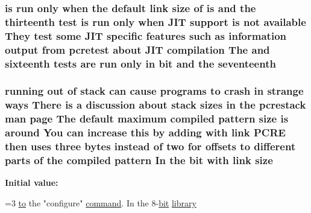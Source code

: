 \subsubsection[{\texorpdfstring{seventeenth}{seventeenth}}]{ {\bf is} {\bf run} only when the {\bf default} link {\bf size} {\bf of} {\bf is} and the thirteenth test {\bf is} {\bf run} only when J\+IT {\bf support} {\bf is} {\bf not} {\bf available} They test some J\+IT specific {\bf features} such {\bf as} information {\bf output} {\bf from} {\bf pcretest} about J\+IT {\bf compilation} The and sixteenth {\bf tests} {\bf are} {\bf run} only {\bf in} {\bf bit} and the seventeenth}\hypertarget{README_8txt_adf2bbc5963b238b03cb6ee36f8940fea}{}\label{README_8txt_adf2bbc5963b238b03cb6ee36f8940fea}
\subsubsection[{\texorpdfstring{size}{size}}]{\setlength{\rightskip}{0pt plus 5cm}running {\bf out} {\bf of} {\bf stack} {\bf can} cause programs {\bf to} crash {\bf in} strange ways There {\bf is} {\bf a} discussion about {\bf stack} sizes {\bf in} the pcrestack {\bf man} page The {\bf default} maximum {\bf compiled} {\bf pattern} size {\bf is} around You {\bf can} increase {\bf this} by {\bf adding} {\bf with} link {\bf P\+C\+RE} then uses three {\bf bytes} instead {\bf of} two for {\bf offsets} {\bf to} different parts {\bf of} the {\bf compiled} {\bf pattern} In the {\bf bit} {\bf with} link size}\hypertarget{README_8txt_ae977c071890b389fcaddb3c89fd5e043}{}\label{README_8txt_ae977c071890b389fcaddb3c89fd5e043}
{\bfseries Initial value\+:}
\begin{DoxyCode}
=3 \hyperlink{group__MOD__PROXY_ga4d80b46c1e04eba6561893714933df30}{to} the \textcolor{stringliteral}{"configure"} \hyperlink{README_8txt_ad096865ab7f15682efeeeb3ef7983ae3}{command}. In the 8-\hyperlink{pcre-config_8txt_aeddb586b79a44fb202dde924852cbbf6}{bit}
  \hyperlink{README_8txt_a74587a939b8fbaa811cdd7327b489d1d}{library}
\end{DoxyCode}
